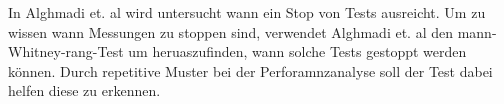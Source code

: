 In Alghmadi et. al \cite{when_stop_tests} wird untersucht wann ein Stop von Tests ausreicht.
Um zu wissen wann Messungen zu stoppen sind, verwendet Alghmadi et. al \cite{when_stop_tests} den mann-Whitney-rang-Test um heruaszufinden, 
wann solche Tests gestoppt werden können. Durch repetitive Muster bei der Perforamnzanalyse soll der Test dabei helfen diese zu erkennen.




